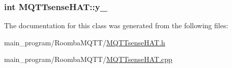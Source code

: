 \subsubsection[{\texorpdfstring{y\+\_\+}{y_}}]{\setlength{\rightskip}{0pt plus 5cm}int M\+Q\+T\+Tsense\+H\+A\+T\+::y\+\_\+\hspace{0.3cm}{\ttfamily [protected]}}\hypertarget{class_m_q_t_tsense_h_a_t_a608b724d2ab92ed1ea3b3c4c1066961d}{}\label{class_m_q_t_tsense_h_a_t_a608b724d2ab92ed1ea3b3c4c1066961d}


The documentation for this class was generated from the following files\+:\begin{DoxyCompactItemize}
\item 
main\+\_\+program/\+Roomba\+M\+Q\+T\+T/\hyperlink{main__program_2_roomba_m_q_t_t_2_m_q_t_tsense_h_a_t_8h}{M\+Q\+T\+Tsense\+H\+A\+T.\+h}\item 
main\+\_\+program/\+Roomba\+M\+Q\+T\+T/\hyperlink{main__program_2_roomba_m_q_t_t_2_m_q_t_tsense_h_a_t_8cpp}{M\+Q\+T\+Tsense\+H\+A\+T.\+cpp}\end{DoxyCompactItemize}
